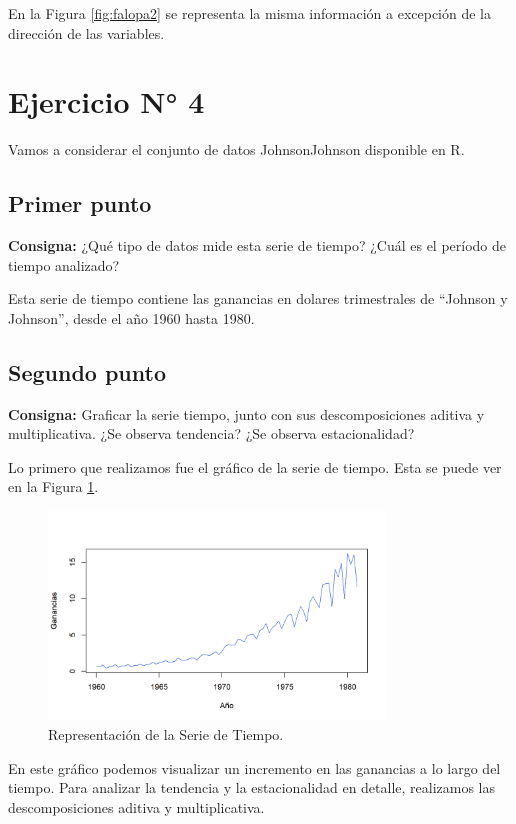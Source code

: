 \documentclass{article} %
\begin{document}
En la Figura \ref{fig:falopa2} se representa la misma información a excepción de la dirección de las variables. 


\section{Ejercicio N° 4}

Vamos a considerar el conjunto de datos JohnsonJohnson disponible en R.

\subsection{Primer punto}

\textbf{Consigna:} ¿Qué tipo de datos mide esta serie de tiempo? ¿Cuál es el período de tiempo analizado?

Esta serie de tiempo contiene las ganancias en dolares trimestrales de ``Johnson y Johnson'', desde el año 1960 hasta 1980.

\subsection{Segundo punto}

\textbf{Consigna:} Graficar la serie tiempo, junto con sus descomposiciones aditiva y multiplicativa. ¿Se observa tendencia? ¿Se observa estacionalidad?

Lo primero que realizamos fue el gráfico de la serie de tiempo. Esta se puede ver en la Figura \ref{fig:SerieOriginal}.

\begin{figure}[H]
	\centering
	\includegraphics[width=0.8\textwidth]{images/4-1 Serie Original}
	\caption{Representación de la Serie de Tiempo.}
	\label{fig:SerieOriginal}
\end{figure} 

En este gráfico podemos visualizar un incremento en las ganancias a lo largo del tiempo. Para analizar la tendencia y la estacionalidad en detalle, realizamos las descomposiciones aditiva y multiplicativa. 
\end{document}
